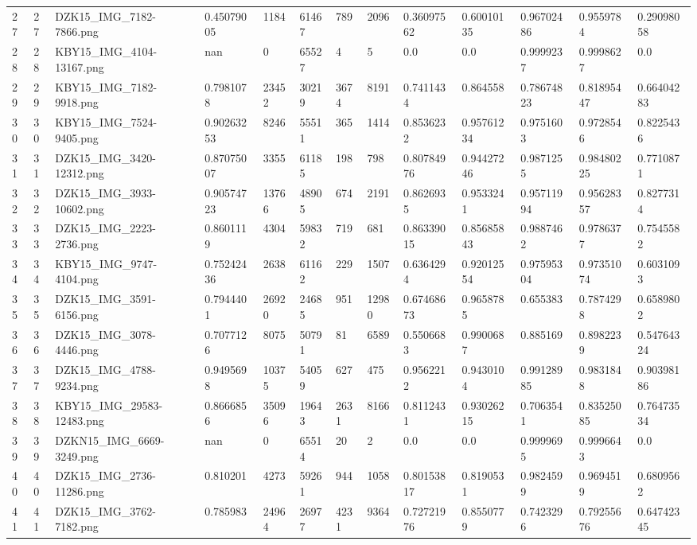 \documentclass[11pt, a4paper, twoside]{report}
\begin{document}
\begin{longtable}[c]{@{}lllllllllllll@{}}
27 & 27 & DZK15\_IMG\_7182-7866.png & 0.45079005 & 1184 & 61467 & 789 & 2096 & 0.36097562 & 0.60010135 & 0.96702486 & 0.9559784 & 0.29098058 \\
28 & 28 & KBY15\_IMG\_4104-13167.png & nan & 0 & 65527 & 4 & 5 & 0.0 & 0.0 & 0.9999237 & 0.9998627 & 0.0 \\
29 & 29 & KBY15\_IMG\_7182-9918.png & 0.7981078 & 23452 & 30219 & 3674 & 8191 & 0.7411434 & 0.864558 & 0.78674823 & 0.81895447 & 0.66404283 \\
30 & 30 & KBY15\_IMG\_7524-9405.png & 0.90263253 & 8246 & 55511 & 365 & 1414 & 0.8536232 & 0.95761234 & 0.9751603 & 0.9728546 & 0.8225436 \\
31 & 31 & DZK15\_IMG\_3420-12312.png & 0.87075007 & 3355 & 61185 & 198 & 798 & 0.80784976 & 0.94427246 & 0.9871255 & 0.98480225 & 0.7710871 \\
32 & 32 & DZK15\_IMG\_3933-10602.png & 0.90574723 & 13766 & 48905 & 674 & 2191 & 0.8626935 & 0.9533241 & 0.95711994 & 0.95628357 & 0.8277314 \\
33 & 33 & DZK15\_IMG\_2223-2736.png & 0.8601119 & 4304 & 59832 & 719 & 681 & 0.86339015 & 0.85685843 & 0.9887462 & 0.9786377 & 0.7545582 \\
34 & 34 & KBY15\_IMG\_9747-4104.png & 0.75242436 & 2638 & 61162 & 229 & 1507 & 0.6364294 & 0.92012554 & 0.97595304 & 0.97351074 & 0.6031093 \\
35 & 35 & DZK15\_IMG\_3591-6156.png & 0.7944401 & 26920 & 24685 & 951 & 12980 & 0.67468673 & 0.9658785 & 0.655383 & 0.7874298 & 0.6589802 \\
36 & 36 & DZK15\_IMG\_3078-4446.png & 0.7077126 & 8075 & 50791 & 81 & 6589 & 0.5506683 & 0.9900687 & 0.885169 & 0.8982239 & 0.54764324 \\
37 & 37 & DZK15\_IMG\_4788-9234.png & 0.9495698 & 10375 & 54059 & 627 & 475 & 0.9562212 & 0.9430104 & 0.99128985 & 0.9831848 & 0.90398186 \\
38 & 38 & KBY15\_IMG\_29583-12483.png & 0.8666856 & 35096 & 19643 & 2631 & 8166 & 0.8112431 & 0.93026215 & 0.7063541 & 0.83525085 & 0.76473534 \\
39 & 39 & DZKN15\_IMG\_6669-3249.png & nan & 0 & 65514 & 20 & 2 & 0.0 & 0.0 & 0.9999695 & 0.9996643 & 0.0 \\
40 & 40 & DZK15\_IMG\_2736-11286.png & 0.810201 & 4273 & 59261 & 944 & 1058 & 0.80153817 & 0.8190531 & 0.9824599 & 0.9694519 & 0.6809562 \\
41 & 41 & DZK15\_IMG\_3762-7182.png & 0.785983 & 24964 & 26977 & 4231 & 9364 & 0.72721976 & 0.8550779 & 0.7423296 & 0.79255676 & 0.64742345 \\

\end{longtable}
\end{document}
